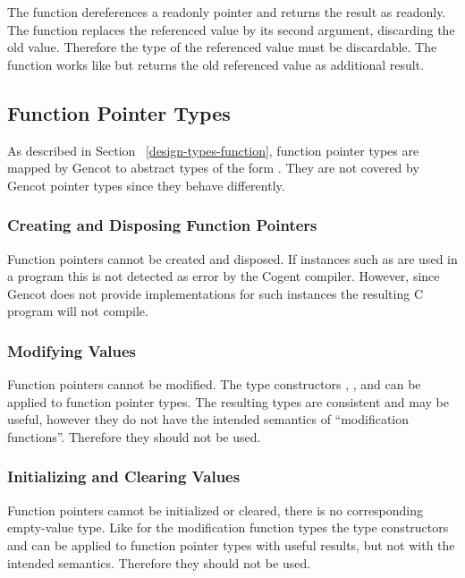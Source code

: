 The function  dereferences a readonly pointer and returns the result as readonly. The function 
replaces the referenced value by its second argument, discarding the old value. Therefore the type  of the referenced 
value must be discardable. The function  works like
 but returns the old referenced value as additional result.

\subsection{Function Pointer Types}
\label{design-operations-function}

As described in Section ~\ref{design-types-function}, function pointer types are mapped by Gencot to abstract types of the form 
. They are not covered by Gencot pointer types since they behave differently.

\subsubsection{Creating and Disposing Function Pointers}

Function pointers cannot be created and disposed. If instances such as  are used in a program 
this is not detected as error by the Cogent compiler. However, since Gencot does not provide implementations for such
instances the resulting C program will not compile.

\subsubsection{Modifying Values}

Function pointers cannot be modified. The type constructors , , and 
can be applied to function pointer types. The resulting types are consistent and may be useful, however they do not have the
intended semantics of ``modification functions''. Therefore they should not be used.

\subsubsection{Initializing and Clearing Values}

Function pointers cannot be initialized or cleared, there is no corresponding empty-value type.
Like for the modification function types the type constructors
 and  can be applied to function pointer types with useful results, but not with the intended semantics.
Therefore they should not be used.

